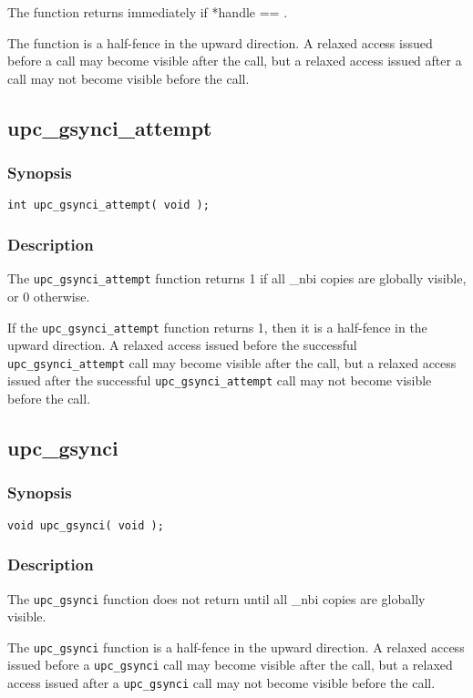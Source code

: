\np The \function{} function returns immediately if *handle ==
\complete{}.

\np The \function{} function is a half-fence in the upward direction.
A relaxed access issued before a \function{} call may become visible after the
call, but a relaxed access issued after a \function{} call may not become
visible before the call.

\newpage
\subsection{upc\_gsynci\_attempt}
\def\function{{\tt upc\_gsynci\_attempt}}

\subsubsection{Synopsis}

\begin{verbatim}
int upc_gsynci_attempt( void );
\end{verbatim}

\subsubsection{Description}

\npf The \function{} function returns 1 if all \_nbi copies are
globally visible, or 0 otherwise.

\np If the \function{} function returns 1, then it is a half-fence in
the upward direction.  A relaxed access issued before the successful
\function{} call may become visible after the call, but a relaxed access
issued after the successful \function{} call may not become visible before
the call.

\subsection{upc\_gsynci}
\def\function{{\tt upc\_gsynci}}

\subsubsection{Synopsis}

\begin{verbatim}
void upc_gsynci( void );
\end{verbatim}

\subsubsection{Description}

\npf The \function{} function does not return until all \_nbi copies
are globally visible.

\np The \function{} function is a half-fence in the upward direction.
A relaxed access issued before a \function{} call may become visible
after the call, but a relaxed access issued after a \function{} call may
not become visible before the call.
